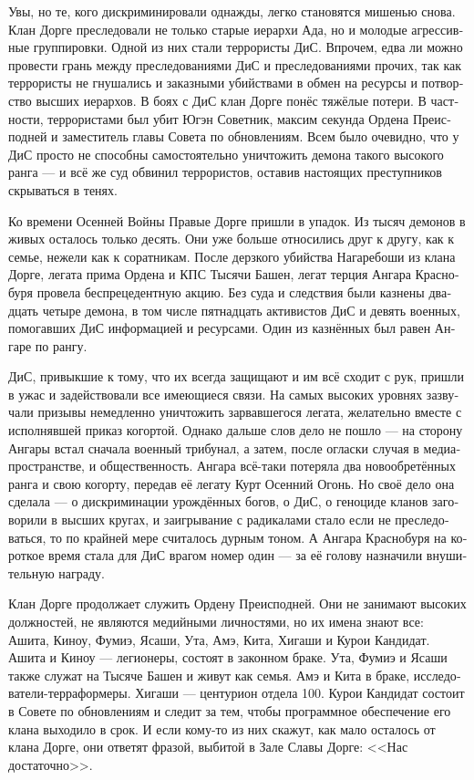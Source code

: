 \documentclass[a4paper,12pt,fleqn]{book}\usepackage{polyglossia}\setdefaultlanguage[babelshorthands=true]{russian}\setotherlanguage{english}\defaultfontfeatures{Ligatures=TeX,Mapping=tex-text}\usepackage{xcolor}\newcommand{\ml}[3]{#2}
\begin{document}
{Увы, но те, кого дискриминировали однажды, легко становятся мишенью снова.
Клан Дорге преследовали не только старые иерархи Ада, но и молодые агрессивные группировки.
Одной из них стали террористы ДиС.
Впрочем, едва ли можно провести грань между преследованиями ДиС и преследованиями прочих, так как террористы не гнушались и заказными убийствами в обмен на ресурсы и потворство высших иерархов.
В боях с ДиС клан Дорге понёс тяжёлые потери.
В частности, террористами был убит Югэн Советник, максим секунда Ордена Преисподней и заместитель главы Совета по обновлениям.
Всем было очевидно, что у ДиС просто не способны самостоятельно уничтожить демона такого высокого ранга --- и всё же суд обвинил террористов, оставив настоящих преступников скрываться в тенях.

Ко времени Осенней Войны Правые Дорге пришли в упадок.
Из тысяч демонов в живых осталось только десять.
Они уже больше относились друг к другу, как к семье, нежели как к соратникам.
После дерзкого убийства Нагаребоши из клана Дорге, легата прима Ордена и КПС Тысячи Башен, легат терция Ангара Краснобуря провела беспрецедентную акцию.
Без суда и следствия были казнены двадцать четыре демона, в том числе пятнадцать активистов ДиС и девять военных, помогавших ДиС информацией и ресурсами.
Один из казнённых был равен Ангаре по рангу.

ДиС, привыкшие к тому, что их всегда защищают и им всё сходит с рук, пришли в ужас и задействовали все имеющиеся связи.
На самых высоких уровнях зазвучали призывы немедленно уничтожить зарвавшегося легата, желательно вместе с исполнявшей приказ когортой.
Однако дальше слов дело не пошло --- на сторону Ангары встал сначала военный трибунал, а затем, после огласки случая в медиапространстве, и общественность.
Ангара всё-таки потеряла два новообретённых ранга и свою когорту, передав её легату Курт Осенний Огонь.
Но своё дело она сделала --- о дискриминации урождённых богов, о ДиС, о геноциде кланов заговорили в высших кругах, и заигрывание с радикалами стало если не преследоваться, то по крайней мере считалось дурным тоном.
А Ангара Краснобуря на короткое время стала для ДиС врагом номер один --- за её голову назначили внушительную награду.

Клан Дорге продолжает служить Ордену Преисподней.
Они не занимают высоких должностей, не являются медийными личностями, но их имена знают все: Ашита, Киноу, Фумиэ, Ясаши, Ута, Амэ, Кита, Хигаши и Курои Кандидат.
Ашита и Киноу --- легионеры, состоят в законном браке. Ута, Фумиэ и Ясаши также служат на Тысяче Башен и живут как семья. Амэ и Кита в браке, исследователи-терраформеры. Хигаши --- центурион отдела 100. Курои Кандидат состоит в Совете по обновлениям и следит за тем, чтобы программное обеспечение его клана выходило в срок. И если кому-то из них скажут, как мало осталось от клана Дорге, они ответят фразой, выбитой в Зале Славы Дорге: <<Нас достаточно>>.

}
\end{document}
